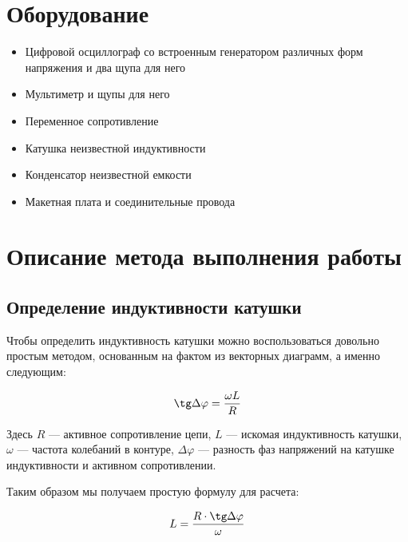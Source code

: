 \documentclass[a4paper, 12pt]{article}
\renewcommand{\phi}{\varphi} %
\begin{document}
\section{Оборудование}

\begin{itemize}
	\item Цифровой осциллограф со встроенным генератором различных форм напряжения и два щупа для него
	
	\item Мультиметр и щупы для него
	
	\item Переменное сопротивление
	
	\item Катушка неизвестной индуктивности
	
	\item Конденсатор неизвестной емкости
	
	\item Макетная плата и соединительные провода
\end{itemize}

\section{Описание метода выполнения работы}


\subsection{Определение индуктивности катушки}

Чтобы определить индуктивность катушки можно воспользоваться довольно простым методом, основанным на фактом из векторных диаграмм, а именно следующим:

\begin{equation}
	\tg\Delta\phi = \frac{\omega L}{R}
	\label{eq:phi_beg}
\end{equation}

Здесь $R$ --- активное сопротивление цепи, $L$ --- искомая индуктивность катушки, $\omega$ --- частота колебаний в контуре, $\Delta\phi$ --- разность фаз напряжений на катушке индуктивности и активном сопротивлении.

Таким образом мы получаем простую формулу для расчета:

\begin{equation}
	L = \frac{R \cdot \tg\Delta\phi}{\omega}
	\label{eq:L}
\end{equation}
\end{document}
